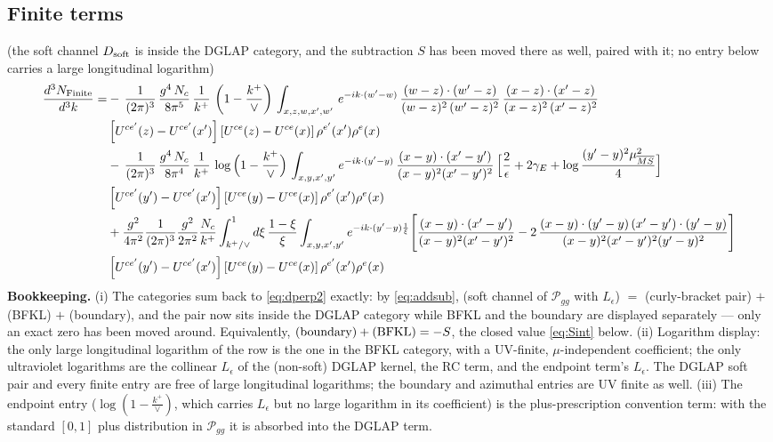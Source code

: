 \documentclass[9pt]{article}
\newcommand{\Leps}{L_{\epsilon}}
\numberwithin{equation}{section}
\begin{document}
\subsection{Finite terms}
{\color{red}(the soft channel $D_{\rm soft}$ is inside the DGLAP category, and the subtraction
$S$ has been moved there as well, paired with it; no entry below carries a large longitudinal
logarithm)}
\begin{align}
    \frac{d^{3}N_{\rm Finite}}{d^{3}k} = & -\,\frac{1}{(2\pi)^{3}}\, \frac{g^{4}\,N_{c}}{8\pi^{5}}\,\frac{1}{k^{+}}\,\left(1-\frac{k^{+}}{\vee}\right)\,\int_{x,z,w,x',w'}\,e^{-ik\cdot (w'-w)}\,\frac{(w-z)\cdot (w'-z)}{(w-z)^{2}\,(w'-z)^{2}}\, \frac{(x-z)\cdot (x'-z)}{(x-z)^{2}\,(x'-z)^{2}}\notag \\ & \left[U^{ce'}(z)-U^{ce'}(x')\right]\left[U^{ce}(z)-U^{ce}(x)\right]\rho^{e'}(x')\rho^{e}(x)\notag \\ &
-\,\frac{1}{(2\pi)^{3}}\,\frac{g^{4}\,N_{c}}{8\pi^{4}}\,\frac{1}{k^{+}}\,\log\Big(1-\frac{k^{+}}{\vee}\Big)\,\int_{x,y,x',y'}e^{-ik\cdot(y'-y)}\,\frac{(x-y)\cdot(x'-y')}{(x-y)^{2}(x'-y')^{2}}\,\Big[\frac{2}{\epsilon}+2\gamma_{E}+\log\frac{(y'-y)^{2}\mu^{2}_{\overline{MS}}}{4}\Big]\notag \\ & \left[U^{ce'}(y')-U^{ce'}(x')\right]\left[U^{ce}(y)-U^{ce}(x)\right]\rho^{e'}(x')\rho^{e}(x)\notag\\
&+\frac{g^{2}}{4\pi^{2}}\frac{1}{(2\pi)^{3}}\frac{g^{2}}{2\pi^{2}}\frac{N_{c}}{k^{+}}\int_{k^{+}/\vee}^{1}d\xi\,\frac{1-\xi}{\xi}\int_{x,y,x',y'}e^{-ik\cdot(y'-y)\frac{1}{\xi}}\Bigg[\frac{(x-y)\cdot(x'-y')}{(x-y)^{2}(x'-y')^{2}}-2\,\frac{(x-y)\cdot(y'-y)\,(x'-y')\cdot(y'-y)}{(x-y)^{2}(x'-y')^{2}(y'-y)^{2}}\Bigg]\notag \\ & \left[U^{ce'}(y')-U^{ce'}(x')\right]\left[U^{ce}(y)-U^{ce}(x)\right]\rho^{e'}(x')\rho^{e}(x)
\end{align}
{\color{red}\textbf{Bookkeeping.} (i) The categories sum back to \eqref{eq:dperp2} exactly: by
\eqref{eq:addsub}, (soft channel of $\mathcal P_{gg}$ with $\Leps$) $=$ (curly-bracket pair)
$+$ (BFKL) $+$ (boundary), and the pair now sits inside the DGLAP category while BFKL and the
boundary are displayed separately --- only an exact zero has been moved around. Equivalently,
$({\rm boundary})+({\rm BFKL})=-S$, the closed value \eqref{eq:Sint} below. (ii) Logarithm
display: the only large longitudinal logarithm of the row is the one in the BFKL category,
with a UV-finite, $\mu$-independent coefficient; the only ultraviolet logarithms are the
collinear $\Leps$ of the (non-soft) DGLAP kernel, the RC term, and the endpoint term's
$\Leps$. The DGLAP soft pair and every finite entry are free of large longitudinal
logarithms; the boundary and azimuthal entries are UV finite as well. (iii) The endpoint entry
($\log(1-\frac{k^{+}}{\vee})$, which carries $\Leps$ but no large logarithm in its
coefficient) is the plus-prescription convention term: with the standard $[0,1]$ plus
distribution in $\mathcal P_{gg}$ it is absorbed into the DGLAP term.}
\end{document}
